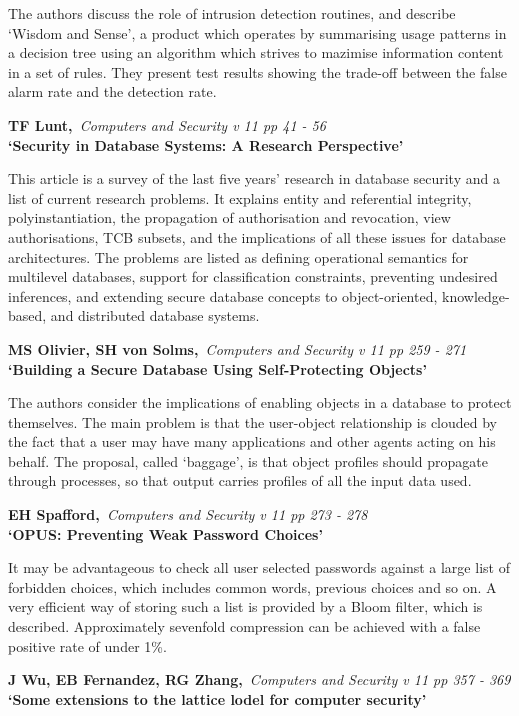 The authors discuss the role of intrusion detection routines, and describe
`Wisdom and Sense', a product which operates by summarising usage patterns in
a decision tree using an algorithm which strives to mazimise information
content in a set of rules. They present test results showing the trade-off 
between the false alarm rate and the detection rate.

\pagebreak

{\bf \noindent TF Lunt,}{\em ~Computers and Security v 11 pp 41 - 56\\}
{\bf `Security in Database Systems: A Research Perspective'}

This article is a survey of the last five years' research in database
security and a list of current research problems. It explains entity and
referential integrity, polyinstantiation, the propagation of authorisation
and revocation, view authorisations, TCB subsets, and the implications of
all these issues for database architectures. The problems are listed as
defining operational semantics for multilevel databases, support for
classification constraints, preventing undesired inferences, and extending
secure database concepts to object-oriented, knowledge-based, and distributed
database systems.

{\bf \noindent MS Olivier, SH von Solms,}{\em ~Computers and Security v 11 pp
259 - 271\\}
{\bf `Building a Secure Database Using Self-Protecting Objects'}

The authors consider the implications of enabling objects in a database to
protect themselves. The main problem is that the user-object relationship is 
clouded by the fact that a user may have many applications and other agents
acting on his behalf. The proposal, called `baggage', is that object profiles
should propagate through processes, so that output carries profiles of all
the input data used.

{\bf \noindent EH Spafford,}{\em ~Computers and Security v 11 pp 273 - 278\\}
{\bf `OPUS: Preventing Weak Password Choices'}

It may be advantageous to check all user selected passwords against a large
list of forbidden choices, which includes common words, previous choices and
so on. A very efficient way of storing such a list is provided by a Bloom
filter, which is described. Approximately sevenfold compression can be 
achieved with a false positive rate of under 1\%.

{\bf \noindent J Wu, EB Fernandez, RG Zhang,}{\em ~Computers and Security v 11
pp 357 - 369\\}
{\bf `Some extensions to the lattice lodel for computer security'}

